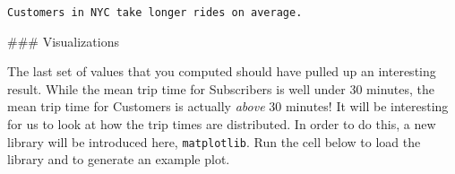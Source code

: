 \documentclass[11pt]{article}
\begin{document}
    \begin{Verbatim}[commandchars=\\\{\}]
Customers in NYC take longer rides on average.

    \end{Verbatim}

     \#\#\# Visualizations

The last set of values that you computed should have pulled up an
interesting result. While the mean trip time for Subscribers is well
under 30 minutes, the mean trip time for Customers is actually
\emph{above} 30 minutes! It will be interesting for us to look at how
the trip times are distributed. In order to do this, a new library will
be introduced here, \texttt{matplotlib}. Run the cell below to load the
library and to generate an example plot.
\end{document}
